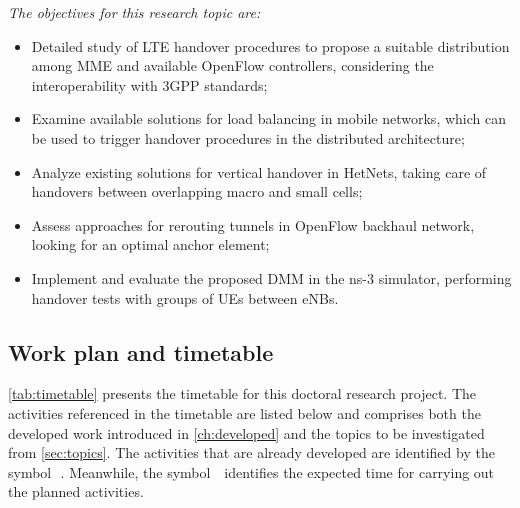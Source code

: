 \emph{The objectives for this research topic are:}
\begin{itemize}
  \item Detailed study of \ac{LTE} handover procedures to propose a suitable
  distribution among \ac{MME} and available OpenFlow controllers, considering
  the interoperability with \ac{3GPP} standards;

  \item Examine available solutions for load balancing in mobile networks,
  which can be used to trigger handover procedures in the distributed
  architecture;

  \item Analyze existing solutions for vertical handover in \acp{HetNet},
  taking care of handovers between overlapping macro and small cells;

  \item Assess approaches for rerouting tunnels in OpenFlow backhaul network,
  looking for an optimal anchor element;

  \item Implement and evaluate the proposed \ac{DMM} in the \ac{ns-3}
  simulator, performing handover tests with groups of \acp{UE} between
  \acp{eNB}.
\end{itemize}


\subsection{Work plan and timetable}
\label{sec:timetable}

\autoref{tab:timetable} presents the timetable for this doctoral research
project. The activities referenced in the timetable are listed below and
comprises both the developed work introduced in \autoref{ch:developed} and the
topics to be investigated from \autoref{sec:topics}. The activities that are
already developed are identified by the symbol~\,\m. Meanwhile, the symbol
\,\x\, identifies the expected time for carrying out the planned activities.

